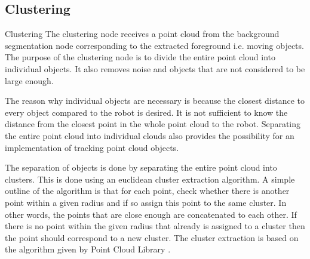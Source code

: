 
\subsection{Clustering}
Clustering
The clustering node receives a point cloud from the background segmentation node corresponding to the extracted foreground i.e. moving objects. The purpose of the clustering node is to divide the entire point cloud into individual objects. It also removes noise and objects that are not considered to be large enough.  

The reason why individual objects are necessary is because the closest distance to every object compared to the robot is desired. It is not sufficient to know the distance from the closest point in the whole point cloud to the robot. Separating the entire point cloud into individual clouds also provides the possibility for an implementation of tracking point cloud objects. 

The separation of objects is done by separating the entire point cloud into clusters. This is done using an euclidean cluster extraction algorithm. A simple outline of the algorithm is that for each point, check whether there is another point within a given radius and if so assign this point to the same cluster. In other words, the points that are close enough are concatenated to each other. If there is no point within the given radius that already is assigned to a cluster then the point should correspond to a new cluster. The cluster extraction is based on the algorithm given by Point Cloud Library \cite{CE}.